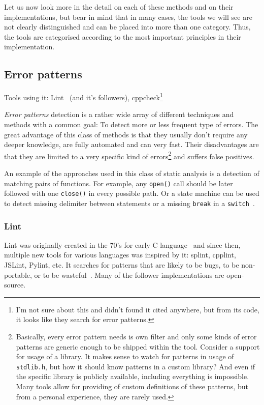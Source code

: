 Let us now look more in the detail on each of these methods and on their implementations, but bear in mind that in many cases, the tools we will see are not clearly distinguished and can be placed into more than one category. Thus, the tools are categorised according to the most important principles in their implementation.

\subsection{Error patterns}
Tools using it: Lint~\cite{KrenaVojnarOverview} (and it's followers), cppcheck\footnote{I'm not sure about this and didn't found it cited anywhere, but from its code, it looks like they search for error patterns.}

{\em Error patterns} detection is a rather wide array of different techniques and methods with a common goal: To detect more or less frequent type of errors. The great advantage of this class of methods is that they usually don't require any deeper knowledge, are fully automated and can very fast. Their disadvantages are that they are limited to a very specific kind of errors\footnote{Basically, every error pattern needs is own filter and only some kinds of error patterns are generic enough to be shipped within the tool. Consider a support for usage of a library. It makes sense to watch for patterns in usage of {\tt stdlib.h}, but how it should know patterns in a custom library? And even if the specific library is publicly available, including everything is impossible. Many tools allow for providing of custom definitions of these patterns, but from a personal experience, they are rarely used.} and suffers false positives.

An example of the approaches used in this class of static analysis is a detection of matching pairs of functions. For example, any {\tt open()} call should be later followed with one {\tt close()} in every possible path. Or a state machine can be used to detect missing delimiter between statements or a missing {\tt break} in a {\tt switch}~\cite{dynamine}.

\subsubsection{Lint}
Lint was originally created in the 70's for early C language~\cite[Chap. 2.2]{KrenaVojnarOverview} and since then, multiple new tools for various languages was inspired by it: splint, cpplint, JSLint, Pylint, etc. It searches for patterns that are likely to be bugs, to be non-portable, or to be wasteful~\cite{lintMan}. Many of the follower implementations are open-source.

